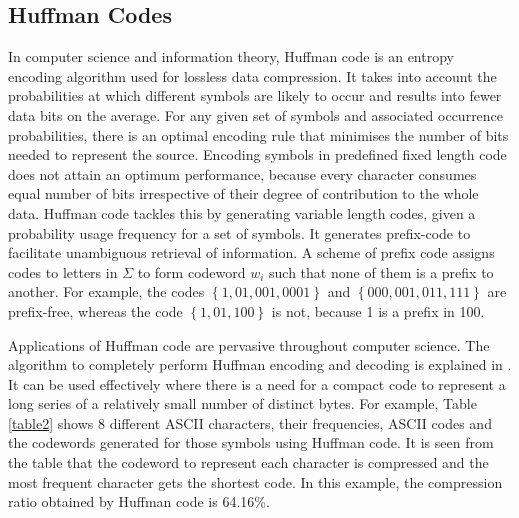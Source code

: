 \documentclass{singlecol-new}
\theoremstyle{TH}{
\newtheorem{lemma}{Lemma}
\newtheorem{theorem}[lemma]{Theorem}
\newtheorem{corrolary}[lemma]{Corrolary}
\newtheorem{conjecture}[lemma]{Conjecture}
\newtheorem{proposition}[lemma]{Proposition}
\newtheorem{claim}[lemma]{Claim}
\newtheorem{stheorem}[lemma]{Wrong Theorem}
}
\theoremstyle{THrm}{
\newtheorem{definition}{Definition}
\newtheorem{question}{Question}
\newtheorem{remark}{Remark}
\newtheorem{scheme}{Scheme}
}
\theoremstyle{THhit}{
\newtheorem{case}{Case}[section]
}
\begin{document}
\subsection{Huffman Codes}
In computer science and information theory, Huffman code is an entropy encoding algorithm used for lossless data compression. It takes into account the probabilities at which different symbols are likely to occur and results into fewer data bits on the average. 
For any given set of symbols and associated occurrence probabilities, there is an optimal encoding rule that minimises the number of bits needed to represent the source. Encoding symbols in predefined fixed length code does not attain an optimum performance, because every character consumes equal number of bits irrespective of their degree of contribution to the whole data. Huffman code tackles this by generating variable length codes, given a probability usage frequency for a set of symbols. It generates prefix-code to facilitate unambiguous retrieval of information. A scheme of prefix code assigns codes to letters in $\Sigma$ to form codeword $w_i$ such that none of them is a prefix to another. For example, the codes $\left\{ 1,01,001,0001\right\}$ and $\left\{ 000,001,011,111\right\}$ are prefix-free, whereas the code $\left\{ 1,01,100\right\}$ is not, because 1 is a prefix in 100.

Applications of Huffman code are pervasive throughout
computer science. The algorithm to completely perform Huffman encoding and decoding is explained in \citep{Amst86}. It can be used effectively where there is a need for a compact code to represent a long series of a relatively small number of distinct bytes. For example, Table \ref{table2} shows 8 different ASCII characters, their frequencies, ASCII codes and the codewords generated for those symbols using Huffman code. It is seen from the table that the codeword to represent each character is compressed and the most frequent character gets the shortest code. In this example, the compression ratio obtained by Huffman code is 64.16\%.   
\end{document}
